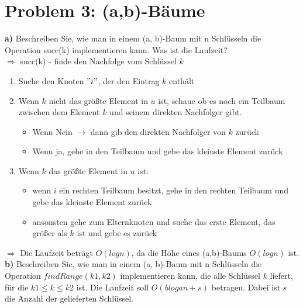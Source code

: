 \section*{Problem 3: (a,b)-Bäume} 

\textbf{a)} Beschreiben Sie, wie man in einem (a, b)-Baum mit n Schlüsseln die Operation succ(k) implementieren kann. Was ist die Laufzeit?\\

$\Rightarrow$ succ(k) - finde den Nachfolge vom Schlüssel $k$

\begin{enumerate}
\item Suche den Knoten $"i"$, der den Eintrag $k$ enthält
\item Wenn $k$ nicht das größte Element in $u$ ist, schaue ob es noch ein Teilbaum zwischen dem Element $k$ und seinem direkten Nachfolger gibt.
	\begin{itemize}
		\item Wenn Nein $\rightarrow$ dann gib den direkten Nachfolger von $k$ zurück
		\item Wenn ja, gehe in den Teilbaum und gebe das kleinste Element zurück
	\end{itemize}
\item Wenn $k$ das größte Element in $u$ ist:
	\begin{itemize}
		\item wenn $i$ ein rechten Teilbaum besitzt, gehe in den rechten Teilbaum und gebe das kleinste Element zurück
		\item ansonsten gehe zum Elternknoten und suche das erste Element, das größer als $k$ ist und gebe es zurück
	\end{itemize}
\end{enumerate}

$\Rightarrow$ Die Laufzeit beträgt $O(logn)$, da die Höhe eines (a,b)-Baums $O(logn)$ ist. \\



\noindent
\textbf{b)} Beschreiben Sie, wie man in einem (a, b)-Baum mit n Schlüsseln die Operation $findRange(k1 , k2)$ implementieren kann, die alle Schlüssel $k$ liefert, für die
$k1 \leq k \leq k2$ ist. Die Laufzeit soll $O(b loga n + s)$ betragen. Dabei ist $s$ die Anzahl der gelieferten Schlüssel.\\

